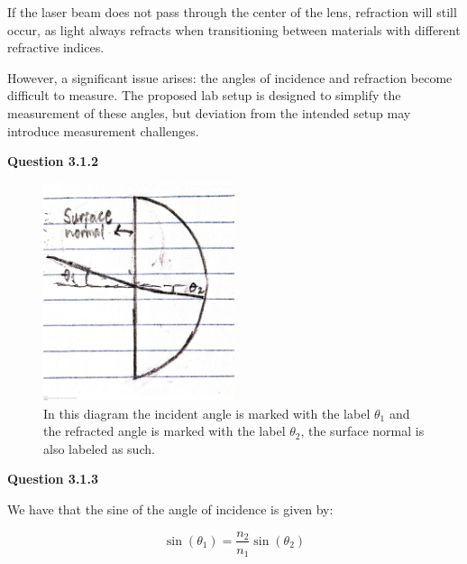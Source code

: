 \documentclass[a4paper,12pt]{article}
\begin{document}
If the laser beam does not pass through the center of the lens, refraction will still occur, as light always refracts when transitioning between materials with different refractive indices.

\vspace{0.1cm}

However, a significant issue arises: the angles of incidence and refraction become difficult to measure. The proposed lab setup is designed to simplify the measurement of these angles, but deviation from the intended setup may introduce measurement challenges.

\vspace{8cm}

\noindent \textbf{\LARGE Question 3.1.2}

\vspace{0.4cm}

\begin{figure}[h]
    \centering
    \includegraphics[width=0.5\textwidth]{first_diagram_lab1_PHY_192.jpg}
    \caption{In this diagram the incident angle is marked with the label $\theta_1$ and the refracted angle is marked with the label $\theta_2$, the surface normal is also labeled as such.} 
\end{figure}

\vspace{1cm}

\noindent \textbf{\LARGE Question 3.1.3}

\vspace{0.4cm}

We have that the sine of the angle of incidence is given by: 

\begin{equation}
    \sin(\theta_1) = \frac{n_2}{n_1} \sin(\theta_2)
\end{equation}
\end{document}
